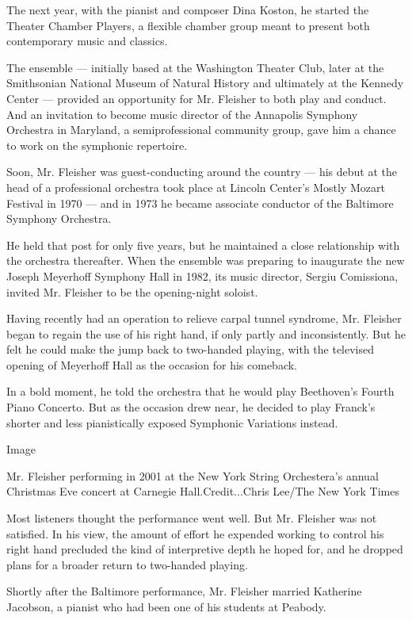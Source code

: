 The next year, with the pianist and composer Dina Koston, he started the
Theater Chamber Players, a flexible chamber group meant to present both
contemporary music and classics.

The ensemble --- initially based at the Washington Theater Club, later
at the Smithsonian National Museum of Natural History and ultimately at
the Kennedy Center --- provided an opportunity for Mr. Fleisher to both
play and conduct. And an invitation to become music director of the
Annapolis Symphony Orchestra in Maryland, a semiprofessional community
group, gave him a chance to work on the symphonic repertoire.

Soon, Mr. Fleisher was guest-conducting around the country --- his debut
at the head of a professional orchestra took place at Lincoln Center's
Mostly Mozart Festival in 1970 --- and in 1973 he became associate
conductor of the Baltimore Symphony Orchestra.

He held that post for only five years, but he maintained a close
relationship with the orchestra thereafter. When the ensemble was
preparing to inaugurate the new Joseph Meyerhoff Symphony Hall in 1982,
its music director, Sergiu Comissiona, invited Mr. Fleisher to be the
opening-night soloist.

Having recently had an operation to relieve carpal tunnel syndrome, Mr.
Fleisher began to regain the use of his right hand, if only partly and
inconsistently. But he felt he could make the jump back to two-handed
playing, with the televised opening of Meyerhoff Hall as the occasion
for his comeback.

In a bold moment, he told the orchestra that he would play Beethoven's
Fourth Piano Concerto. But as the occasion drew near, he decided to play
Franck's shorter and less pianistically exposed Symphonic Variations
instead.

Image

Mr. Fleisher performing in 2001 at the New York String Orchestera's
annual~ Christmas Eve concert at Carnegie Hall.Credit...Chris Lee/The
New York Times

Most listeners thought the performance went well. But Mr. Fleisher was
not satisfied. In his view, the amount of effort he expended working to
control his right hand precluded the kind of interpretive depth he hoped
for, and he dropped plans for a broader return to two-handed playing.

Shortly after the Baltimore performance, Mr. Fleisher married Katherine
Jacobson, a pianist who had been one of his students at Peabody.

